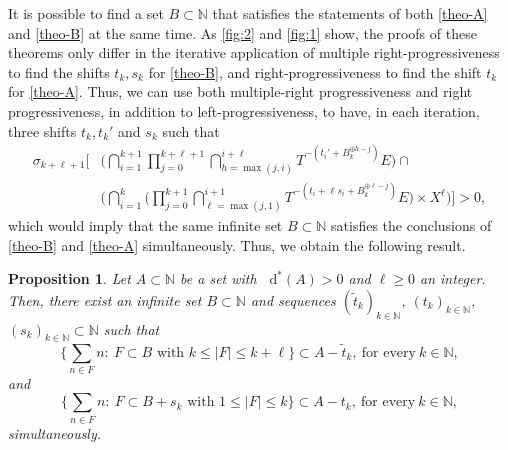 \documentclass[letter, 11pt]{article}
\newtheorem{prop}[theo]{Proposition}
\theoremstyle{definition}
\theoremstyle{plain}
\newcommand{\N}{\mathbb{N}}
\newcommand*\diff{\mathop{}\!\mathrm{d}}
\newcommand{\edit}[3]{\color{#1}{#3}\color{black}\marginpar{\textcolor{#1}{[[#2]]}}}
\newcommand{\tristan}[1]{\edit{magenta}{TR}{#1}}
\newcommand{\1}{\mathbbm{1}}
\begin{document}
 It is possible to find a set $B\subset \N$ that satisfies the statements of both \cref{theo-A} and \cref{theo-B} at the same time. As \cref{fig:2} and \cref{fig:1} show, the proofs of these theorems only differ in the iterative application of multiple right-progressiveness to find the shifts $t_k,s_k$ for \cref{theo-B}, and right-progressiveness to find the shift $t_k$ for \cref{theo-A}. Thus, we can use both multiple-right progressiveness and right progressiveness, in addition to left-progressiveness, to have, in each iteration, three shifts $t_k, t_k'$ and $s_k$ such that
    \begin{align*}
    \sigma_{k+\ell+1}\Bigg[& \Bigg( \bigcap_{i=1}^{k+1}  \prod_{j=0}^{k+\ell+1}\bigcap_{h=\max(j,i)}^{i+\ell}  T^{-\left( t_i'+ B_k^{\oplus h-j} \right)}  E  \Bigg)    \cap\\
    &\Bigg(\bigcap_{i=1}^k  \Bigg(\prod_{j=0}^{k+1}  \bigcap_{\ell=\max(j,1)}^{i+1}  T^{-\left( t_i+\ell s_i+ B_k^{\oplus \ell-j} \right)}  E   \Bigg) \times X^\ell \Bigg) \Bigg] >0, 
    \end{align*}
    which would imply that  the same infinite set $B\subset \N$ satisfies the conclusions of \cref{theo-B} and \cref{theo-A} simultaneously. Thus, we obtain the following result. 
\begin{prop}\label{Mix-of-Theo-A-and-B}
Let $A\subset\N$ be a set with $\diff^*(A)>0$ and $\ell\geq 0$ an integer. Then, there exist an infinite set $B\subset \N$ and sequences $(\tilde{t}_{k})_{k\in \N}$, $ (t_k)_{k\in \N}$, $(s_k)_{k\in \N} \subset \N$ such that 
$$ \bigg\{ \sum_{n\in F} n \colon \ F\subset B \text{ with } k\leq |F|\leq k+ \ell \bigg\} \subset A-\tilde{t}_{k}, \ \text{for every}\ k\in \N,$$
and
$$ \bigg\{ \sum_{n\in F} n \colon \ F\subset B+s_k \text{ with } 1\leq |F|\leq k \bigg\} \subset A-t_k ,\ \text{for every}\ k\in \N,$$
simultaneously.
\end{prop}


\appendix




\end{document}
